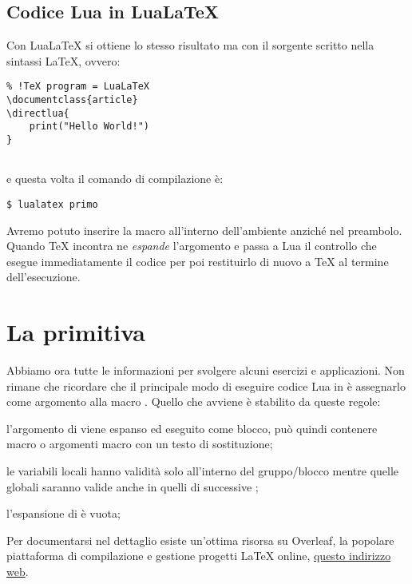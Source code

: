 \subsection{Codice Lua in Lua\LaTeX}
\label{secLuaInLuaLaTeX}

Con Lua\LaTeX{} si ottiene lo stesso risultato ma con il sorgente scritto nella
sintassi \LaTeX, ovvero:
\begin{Verbatim}
% !TeX program = LuaLaTeX
\documentclass{article}
\directlua{
    print("Hello World!")
}


\end{Verbatim}
e questa volta il comando di compilazione è:
\begin{Verbatim}[numbers=none]
$ lualatex primo
\end{Verbatim}

Avremo potuto inserire la macro all'interno dell'ambiente  anziché
nel preambolo. Quando \TeX{} incontra  ne \emph{espande}
l'argomento e passa a Lua il controllo che esegue immediatamente il codice per
poi restituirlo di nuovo a \TeX{} al termine dell'esecuzione.


\section{La primitiva }

Abbiamo ora tutte le informazioni per svolgere alcuni esercizi e applicazioni.
Non rimane che ricordare che il principale modo di eseguire codice Lua in
\LuaTeX{} è assegnarlo come argomento alla macro . Quello che
avviene è stabilito da queste regole:
\begin{compactenumerate}
\item l'argomento di  viene espanso ed eseguito come blocco, può
quindi contenere macro o argomenti macro con un testo di sostituzione;

\item le variabili locali hanno validità solo all'interno del gruppo/blocco
mentre quelle globali saranno valide anche in quelli di successive
;

\item l'espansione di  è vuota;
\end{compactenumerate}

Per documentarsi nel dettaglio esiste un'ottima risorsa su Overleaf, la popolare
piattaforma di compilazione e gestione progetti \LaTeX{} online,
\href{https://cs.overleaf.com/learn/latex/Articles/An_Introduction_to_LuaTeX_(Part_2):_Understanding_%5Cdirectlua}{questo indirizzo web}.


